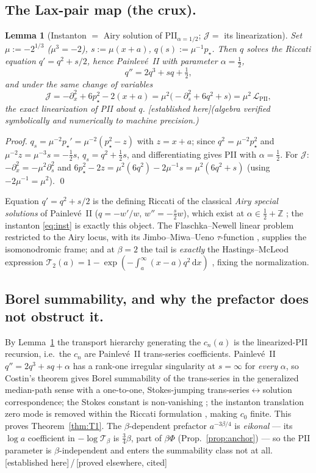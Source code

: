 \documentclass[11pt,reqno]{amsart}
\theoremstyle{plain}
\newtheorem{lemma}[theorem]{Lemma}
\theoremstyle{definition}
\theoremstyle{remark}
\newcommand{\dd}{\,\mathrm{d}}
\newcommand{\Z}{\mathbb{Z}}
\newcommand{\pinst}{p_\star}
\newcommand{\tagPr}{{\footnotesize\textsf{[established here]}}}
\newcommand{\tagP}{{\footnotesize\textsf{[proved elsewhere, cited]}}}
\begin{document}
\subsection{The Lax-pair map (the crux).}
\begin{lemma}[Instanton $=$ Airy solution of PII${}_{\alpha=1/2}$; $\mathcal J=$ its linearization]
\label{lem:lax}
Set $\mu:=-2^{1/3}$ ($\mu^3=-2$), $s:=\mu(x+a)$, $q(s):=\mu^{-1}\pinst$. Then $q$ solves the
Riccati equation $q'=q^2+s/2$, hence Painlev\'e~II with parameter $\alpha=\tfrac12$,
\[
q''=2q^3+sq+\tfrac12,
\]
and under the same change of variables
\[
\mathcal J=-\partial_x^2+6\pinst^2-2(x+a)=\mu^2\bigl(-\partial_s^2+6q^2+s\bigr)=\mu^2\,\mathcal L_{\mathrm{PII}},
\]
the exact linearization of PII about $q$. \tagPr\emph{(algebra verified symbolically and
numerically to machine precision.)}
\end{lemma}
\begin{proof}
$q_s=\mu^{-2}\pinst'=\mu^{-2}(\pinst^2-z)$ with $z=x+a$; since $q^2=\mu^{-2}\pinst^2$ and
$\mu^{-2}z=\mu^{-3}s=-\tfrac12 s$, $q_s=q^2+\tfrac12 s$, and differentiating gives PII with
$\alpha=\tfrac12$. For $\mathcal J$: $-\partial_x^2=-\mu^2\partial_s^2$ and
$6\pinst^2-2z=\mu^2(6q^2)-2\mu^{-1}s=\mu^2(6q^2+s)$ (using $-2\mu^{-1}=\mu^2$). \qed
\end{proof}
Equation $q'=q^2+s/2$ is the defining Riccati of the classical \emph{Airy special solutions} of
Painlev\'e~II ($q=-w'/w$, $w''=-\tfrac{s}{2}w$), which exist at $\alpha\in\tfrac12+\Z$ \cite{FIKN,Clarkson};
the instanton \eqref{eq:inst} is exactly this object. The Flaschka--Newell linear problem
\cite{FN1980} restricted to the Airy locus, with its Jimbo--Miwa--Ueno $\tau$-function
\cite{JMU1981}, supplies the isomonodromic frame; and at $\beta=2$ the tail is \emph{exactly} the
Hastings--McLeod expression $\mathcal T_2(a)=1-\exp(-\int_a^\infty(x-a)q^2\dd x)$ \cite{TW1994},
fixing the normalization.

\subsection{Borel summability, and why the prefactor does not obstruct it.}
By Lemma~\ref{lem:lax} the transport hierarchy generating the $c_n(a)$ is the linearized-PII
recursion, i.e.\ the $c_n$ are Painlev\'e~II trans-series coefficients. Painlev\'e~II
$q''=2q^3+sq+\alpha$ has a rank-one irregular singularity at $s=\infty$ for \emph{every} $\alpha$,
so Costin's theorem \cite{Costin} gives Borel summability of the trans-series in the generalized
median-path sense with a one-to-one, Stokes-jumping trans-series$\leftrightarrow$solution
correspondence; the Stokes constant is non-vanishing \cite{CCK}; the instanton translation zero
mode is removed within the Riccati formulation \cite{SGG}, making $c_0$ finite. This proves
Theorem~\ref{thm:T1}. The $\beta$-dependent prefactor $a^{-3\beta/4}$ is \emph{eikonal} --- its
$\log a$ coefficient in $-\log\mathcal T_\beta$ is $\tfrac34\beta$, part of $\beta\Phi$
(Prop.~\ref{prop:anchor}) --- so the PII parameter is $\beta$-independent and enters the summability
class not at all. \tagPr\,/\,\tagP
\end{document}
